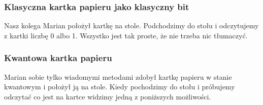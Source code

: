 \documentclass[10pt,t]{beamer}
\begin{document}
\begin{frame}
  \frametitle{Klasyczna kartka papieru jako klasyczny bit}


  Nasz kolega Marian położył kartkę na stole. Podchodzimy do stołu i
  odczytujemy z kartki liczbę 0 albo 1. Wszystko jest tak proste, że
  nie trzeba nic tłumaczyć.






\end{frame}





\begin{frame}
  \frametitle{Kwantowa kartka papieru}


  Marian sobie tylko wiadomymi metodami zdobył kartkę papieru w stanie
  kwantowym i położył ją na stole. Kiedy pochodzimy do stołu i
  próbujemy odczytać co jest na kartce widzimy jedną z poniższych
  możliwości.






\end{frame}
\end{document}
